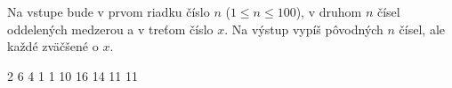 




Na vstupe bude v prvom riadku číslo $n$ ($1\leq n\leq 100$), v druhom $n$ čísel oddelených medzerou a v treťom číslo $x$.
Na výstup vypíš pôvodných $n$ čísel, ale každé zväčšené o $x$.

2 6 4 1 1
10
 16 14 11 11
\koniec



